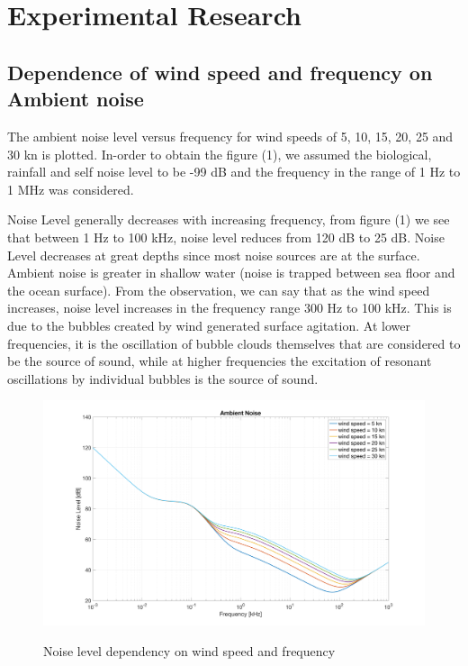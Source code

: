 \chapter*{Experimental Research}


\section{ Dependence of wind speed and frequency on Ambient noise } \label{ Dependence of wind speed and frequency on Ambient noise } 
\noindent  The ambient noise level versus frequency for wind speeds of 5, 10, 15, 20, 25 and 30 kn is plotted. In-order to obtain the figure (1), we assumed the biological, rainfall and self noise level to be -99 dB and the frequency in the range of 1 Hz to 1 MHz was considered.

\noindent Noise Level generally decreases with  increasing frequency, from figure (1) we see that between 1 Hz to 100 kHz, noise level reduces from 120 dB to 25 dB. Noise Level decreases at great depths since most noise sources are at the surface. Ambient noise is greater in shallow water (noise is trapped between sea floor and the ocean surface). From the observation, we can say that as the wind speed increases, noise level increases in the frequency range 300 Hz to 100 kHz. This is due to the bubbles created by wind generated surface agitation.  At lower frequencies, it is the oscillation of bubble clouds themselves that are considered to be the source of sound, while at higher frequencies the excitation of resonant oscillations by individual bubbles is the source of sound.

\begin{figure}[H]
\centering
{\includegraphics[scale=0.18]{usp4_1.png}}
\caption{Noise level dependency on wind speed and frequency}
\end{figure}

